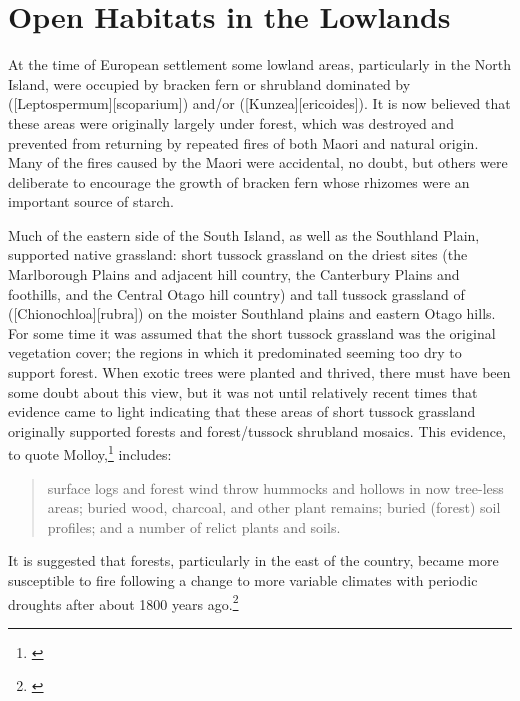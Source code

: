 \chapter{Open Habitats in the Lowlands}%
\label{ch:openhabitats}

At the time of European settlement some lowland areas, particularly in the North Island, were occupied by bracken fern or shrubland dominated by  ([Leptospermum][scoparium]) and/or  ([Kunzea][ericoides]).
It is now believed that these areas were originally largely under forest, which was destroyed and prevented from returning by repeated fires of both Maori and natural origin.
Many of the fires caused by the Maori were accidental, no doubt, but others were deliberate to encourage the growth of bracken fern whose rhizomes were an important source of starch.

Much of the eastern side of the South Island, as well as the Southland Plain, supported native grassland: short tussock grassland on the driest sites (the Marlborough Plains and adjacent hill country, the Canterbury Plains and foothills, and the Central Otago hill country) and tall tussock grassland of  ([Chionochloa][rubra]) on the moister Southland plains and eastern Otago hills.
For some time it was assumed that the short tussock grassland was the original vegetation cover; the regions in which it predominated seeming too dry to support forest.
When exotic trees were planted and thrived, there must have been some doubt about this view, but it was not until relatively recent times that evidence came to light indicating that these areas of short tussock grassland originally supported forests and forest/tussock shrubland mosaics.
This evidence, to quote Molloy,\footnote{\cite{molloybpj1963distribution}} includes:

\begin{quote}
	surface logs and forest wind throw hummocks and hollows in now tree-less areas; buried wood, charcoal, and other plant remains; buried (forest) soil profiles; and a number of relict plants and soils.
\end{quote}

It is suggested that forests, particularly in the east of the country, became more susceptible to fire following a change to more variable climates with periodic droughts after about 1800 years ago.\footnote{\cite{mcglone1977ascarina}}

